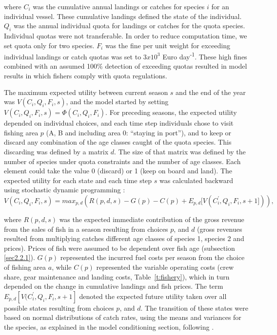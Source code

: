 \documentclass[12pt,oneline,a4paper,numbib]{ouparticle}
\numberwithin{equation}{subsection} %
\begin{document}
where $C_i$ was the cumulative annual landings or catches for species $i$ for an individual vessel. These cumulative landings defined the state of the individual. $Q_i$ was the annual individual quota for landings or catches for the quota species. Individual quotas were not transferable. In order to reduce computation time, we set quota only for two species. $F_i$ was the fine per unit weight for exceeding individual landings or catch quotas was set to $3 x 10^3$ Euro day\textsuperscript{-1}. These high fines combined with an assumed 100\% detection of exceeding quotas resulted in model results in which fishers comply with quota regulations.

The maximum expected utility between current season $s$ and the end of the year was $V (C_i, Q_i, F_i, s)$, and the model started by setting $V (C_i, Q_i, F_i, s)= \Phi (C_i, Q_i, F_i)$. For preceding seasons, the expected utility depended on individual choices, and each time step individuals chose to visit fishing area $p$ (A, B and including area 0: “staying in port”), and to keep or discard any combination of the age classes caught of the quota species. This discarding was defined by a matrix $d$. The size of that matrix was defined by the number of species under quota constraints and the number of age classes. Each element could take the value 0 (discard) or 1 (keep on board and land). The expected utility for each state and each time step $s$ was calculated backward using stochastic dynamic programming \cite{ClarkandMangel2000}:
\begin{equation}
V (C_i, Q_i, F_i, s) = max_{p,d}( R(p, d, s)- G(p) - C(p) + E_{p, d}[V (C_i^\prime, Q_i, F_i, s+1])),
\end{equation}

where $R(p, d, s)$ was the expected immediate contribution of the gross revenue from the sales of fish in a season resulting from choices $p$, and $d$ (gross revenues resulted from multiplying catches different age classes of species 1, species 2 and prices). Prices of fish were assumed to be dependent over fish age (subsection \ref{sec2.2.1}). $G(p)$ represented the incurred fuel costs per season from the choice of fishing area $a$, while  $ C(p)$ represented the variable operating costs (crew share, gear maintenance and landing costs, Table~\ref{t:fishery}), which in turn depended on the change in cumulative landings and fish prices. The term $E_{p, d}[V (C_i^\prime, Q_i, F_i, s+1]$ denoted the expected future utility taken over all possible states resulting from choices $p$, and $d$. The transition of these states were based on normal distributions of catch rates, using the means and variances for the species, as explained in the model conditioning section, following \cite{Poos2010}.
\end{document}
